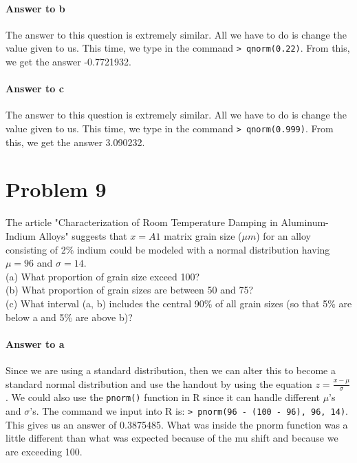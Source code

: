 \documentclass{article}
\begin{document}
	\paragraph{Answer to b}
	The answer to this question is extremely similar. All we have to do is change the value given to 
	us. This time, we type in the command \texttt{> qnorm(0.22)}. From this, we get the answer 
	-0.7721932.
	
	\paragraph{Answer to c}
	The answer to this question is extremely similar. All we have to do is change the value given to 
	us. This time, we type in the command \texttt{> qnorm(0.999)}. From this, we get the answer 
	3.090232.

\clearpage
\section*{Problem 9}

	The article "Characterization of Room Temperature Damping in Aluminum-Indium Alloys"
	suggests that $x = A1$ matrix grain size ($\mu m$) for an alloy consisting of 2\% indium could 
	be modeled with a normal distribution having $\mu = 96$ and $\sigma = 14$. \\
	
	\noindent (a) What proportion of grain size exceed 100? \\
	(b) What proportion of grain sizes are between 50 and 75? \\
	(c) What interval (a, b) includes the central 90\% of all grain sizes (so that 5\% are below a and
	5\% are above b)?
	
	\paragraph{Answer to a}
	Since we are using a standard distribution, then we can alter this to become a standard normal 
	distribution and use the handout by using the equation $z = \frac{x - \mu}{\sigma}$. We could 
	also use the \texttt{pnorm()} function in R since it can handle different $\mu$'s and $\sigma$'s. 
	The command we input into R is: \texttt{> pnorm(96 - (100 - 96), 96, 14)}. This gives us an 
	answer of 0.3875485. What was inside the pnorm function was a little different than what was 
	expected because of the mu shift and because we are exceeding 100.
	
\end{document}

